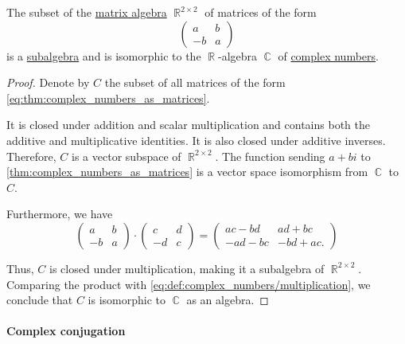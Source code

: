 \begin{proposition}\label{thm:complex_numbers_as_matrices}
  The subset of the \hyperref[thm:matrix_algebra]{matrix algebra} \( \BbbR^{2 \times 2} \) of matrices of the form
  \begin{equation}\label{eq:thm:complex_numbers_as_matrices}
    \begin{pmatrix}
      a  & b \\
      -b & a
    \end{pmatrix}
  \end{equation}
  is a \hyperref[def:algebra_over_ring/submodel]{subalgebra} and is isomorphic to the \( \BbbR \)-algebra \( \BbbC \) of \hyperref[def:complex_numbers]{complex numbers}.
\end{proposition}
\begin{proof}
  Denote by \( C \) the subset of all matrices of the form \eqref{eq:thm:complex_numbers_as_matrices}.

  It is closed under addition and scalar multiplication and contains both the additive and multiplicative identities. It is also closed under additive inverses. Therefore, \( C \) is a vector subspace of \( \BbbR^{2 \times 2} \). The function sending \( a + bi \) to \eqref{thm:complex_numbers_as_matrices} is a vector space isomorphism from \( \BbbC \) to \( C \).

  Furthermore, we have
  \begin{equation*}
    \begin{pmatrix}
      a  & b \\
      -b & a
    \end{pmatrix}
    \cdot
    \begin{pmatrix}
      c  & d \\
      -d & c
    \end{pmatrix}
    =
    \begin{pmatrix}
      ac - bd  & ad + bc \\
      -ad - bc & -bd + ac.
    \end{pmatrix}
  \end{equation*}

  Thus, \( C \) is closed under multiplication, making it a subalgebra of \( \BbbR^{2 \times 2} \). Comparing the product with \eqref{eq:def:complex_numbers/multiplication}, we conclude that \( C \) is isomorphic to \( \BbbC \) as an algebra.
\end{proof}

\paragraph{Complex conjugation}

